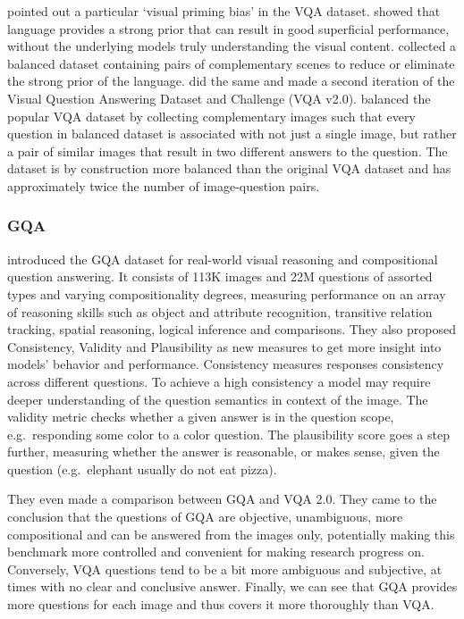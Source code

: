 \documentclass[
]{krantz}
\begin{document}
\citet{zhang2016yin} pointed out a particular `visual priming bias' in the VQA dataset. \citet{zhang2016yin} showed that language provides a strong prior that can result in good superficial performance, without the underlying models truly understanding the visual content. \citet{zhang2016yin} collected a balanced dataset containing pairs of complementary scenes to reduce or eliminate the strong prior of the language. \citet{goyal2017making} did the same and made a second iteration of the Visual Question Answering Dataset and Challenge (VQA v2.0). \citet{goyal2017making} balanced the popular VQA dataset \citep{antol2015vqa} by collecting complementary images such that every question in balanced dataset is associated with not just a single image, but rather a pair of similar images that result in two different answers to the question. The dataset is by construction more balanced than the original VQA dataset and has approximately twice the number of image-question pairs.

\hypertarget{gqa}{%
\subsubsection{GQA}\label{gqa}}

\citet{hudson2019gqa} introduced the GQA dataset for real-world visual reasoning and compositional question answering. It consists of 113K images and 22M questions of assorted types and varying compositionality degrees, measuring performance on an array of reasoning skills such as object and attribute recognition, transitive relation tracking, spatial reasoning, logical inference and comparisons. They also proposed Consistency, Validity and Plausibility as new measures to get more insight into models' behavior and performance. Consistency measures responses consistency across different questions. To achieve a high consistency a model may require deeper understanding of the question semantics in context of the image. The validity metric checks whether a given answer is in the question scope, e.g.~responding some color to a color question. The plausibility score goes a step further, measuring whether the answer is reasonable, or makes sense, given the question (e.g.~elephant usually do not eat pizza).

They even made a comparison between GQA and VQA 2.0. They came to the conclusion that the questions of GQA are objective, unambiguous, more compositional and can be answered from the images only, potentially making this benchmark more controlled and convenient for making research progress on. Conversely, VQA questions tend to be a bit more ambiguous and subjective, at times with no clear and conclusive answer. Finally, we can see that GQA provides more questions for each image and thus covers it more thoroughly than VQA.
\end{document}
